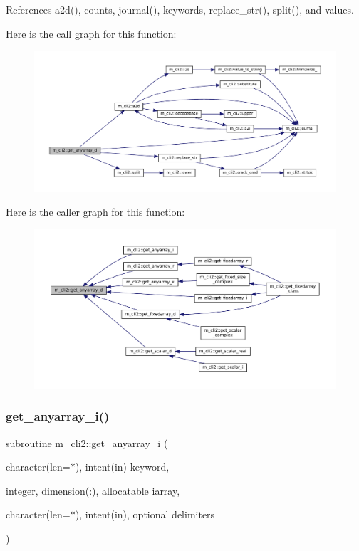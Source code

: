 References a2d(), counts, journal(), keywords, replace\+\_\+str(), split(), and values.

Here is the call graph for this function\+:\nopagebreak
\begin{figure}[H]
\begin{center}
\leavevmode
\includegraphics[width=350pt]{namespacem__cli2_aaede1f28172778cf45f4b6c04967bbbd_cgraph}
\end{center}
\end{figure}
Here is the caller graph for this function\+:\nopagebreak
\begin{figure}[H]
\begin{center}
\leavevmode
\includegraphics[width=350pt]{namespacem__cli2_aaede1f28172778cf45f4b6c04967bbbd_icgraph}
\end{center}
\end{figure}
\mbox{\label{namespacem__cli2_ad314315dd5c93abff5168265f5ff0e4e}} 
\subsubsection{\texorpdfstring{get\+\_\+anyarray\+\_\+i()}{get\_anyarray\_i()}}
{\footnotesize\ttfamily subroutine m\+\_\+cli2\+::get\+\_\+anyarray\+\_\+i (\begin{DoxyParamCaption}\item[{character(len=$\ast$), intent(in)}]{keyword,  }\item[{integer, dimension(\+:), allocatable}]{iarray,  }\item[{character(len=$\ast$), intent(in), optional}]{delimiters }\end{DoxyParamCaption})\hspace{0.3cm}{\ttfamily [private]}}



